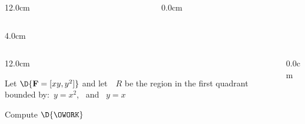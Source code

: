 \begin{frame}
\begin{columns}
\begin{column}{12.0cm}
\begin{columns}
\begin{column}{4.0cm}
	
\end{column}
\end{columns}

\vspace{7.2cm}

\end{column}\begin{column}{0.0cm}\end{column}\end{columns}
\end{frame}

\begin{frame}
\begin{columns}\begin{column}{12.0cm}

\scriptsize

\EX Let $\D{{\bf F} = [xy, y^2]}$ and let \,\, $R$ be the region in the first quadrant bounded by:\, $y=x^2$, \, and \, $y=x$

\vspace{0.2cm}

Compute \quad $\D{\OWORK}$

\vspace{0.2cm}

\vspace{7.2cm}

\end{column}\begin{column}{0.0cm}\end{column}\end{columns}
\end{frame}

